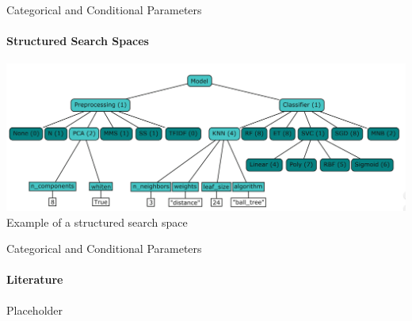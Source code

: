 \begin{frame}[c]{Categorical and Conditional Parameters}
\framesubtitle{Structured Search Spaces}
\begin{center}
    \includegraphics[width=.9\linewidth, height=0.9\textheight, keepaspectratio=true]{w06_hpo_bo/images/categ_cond_params/Conditional Parameters AutoML Book.png}
    \newline
    Example of a structured search space 
\end{center}
\end{frame}
\begin{frame}[c]{Categorical and Conditional Parameters}
\framesubtitle{Literature}
\begin{center}
    Placeholder
\end{center}
\end{frame}

